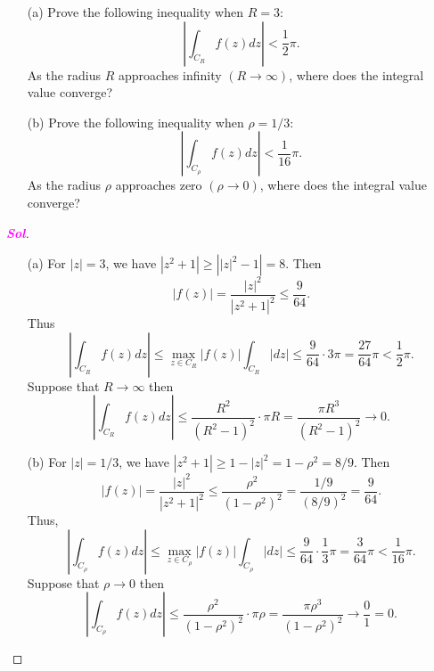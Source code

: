 \documentclass{article}
\theoremstyle{definition}
\newcommand{\of}[1]{\left( #1 \right)}
\newcommand{\abs}[1]{\left\lvert #1 \right\rvert}
\newcommand{\sol}{\textcolor{magenta}{\bf Sol}}
\begin{document}
\begin{enumerate}
\begin{center}
	\end{center}
	\vspace{4pt}
	\begin{enumerate}
		\item[(a)] Prove the following inequality when $R=3$: \[
		\abs{\int_{C_R}f\of{z}dz}<\frac{1}{2}\pi.
		\] As the radius $R$ approaches infinity $\of{R\to\infty}$, where does the integral value converge?
		\item[(b)] Prove the following inequality when $\rho = 1/3$:
		\[
		\abs{\int_{C_\rho}f\of{z}dz}<\frac{1}{16}\pi.
		\] As the radius $\rho$ approaches zero $\of{\rho\to 0}$, where does the integral value converge?
	\end{enumerate}
	\begin{proof}[\sol]
	\begin{enumerate}
			\item[(a)] For $\abs{z}=3$, we have $\abs{z^2+1}\geq\abs{\abs{z}^2-1}=8$. Then \[
			\abs{f\of{z}}=\frac{\abs{z}^2}{\abs{z^2+1}^2}\leq\frac{9}{64}.
			\] Thus \[
			\abs{\int_{C_R}f\of{z}dz}\leq\max_{z\in C_R}\abs{f\of{z}}\int_{C_R}\abs{dz}\leq\frac{9}{64}\cdot3\pi=\frac{27}{64}\pi<\frac{1}{2}\pi.
			\] Suppose that $R\to\infty$ then \[
			\abs{\int_{C_R}f\of{z}dz}\leq\frac{R^2}{\of{R^2-1}^2}\cdot\pi R=\frac{\pi R^3}{\of{R^2-1}^2}\to 0.
			\]
			\vspace{4pt}
			\item[(b)] For $\abs{z}=1/3$, we have $\abs{z^2+1}\geq 1-\abs{z}^2=1-\rho^2=8/9$. Then \[
			\abs{f\of{z}}=\frac{\abs{z}^2}{\abs{z^2+1}^2}\leq\frac{\rho^2}{(1-\rho^2)^2}=\frac{1/9}{\of{8/9}^2}=\frac{9}{64}.
			\] Thus, \[
			\abs{\int_{C_\rho}f\of{z}dz}\leq\max_{z\in C_\rho}\abs{f\of{z}}\int_{C_\rho}\abs{dz}\leq\frac{9}{64}\cdot\frac{1}{3}\pi=\frac{3}{64}\pi<\frac{1}{16}\pi.
			\] Suppose that $\rho\to 0$ then \[
			\abs{\int_{C_\rho}f\of{z}dz}\leq\frac{\rho^2}{\of{1-\rho^2}^2}\cdot\pi \rho=\frac{\pi \rho^3}{\of{1-\rho^2}^2}\to \frac{0}{1}=0.
			\]
		\end{enumerate}
	\end{proof}
	

\end{enumerate}
\end{document}
